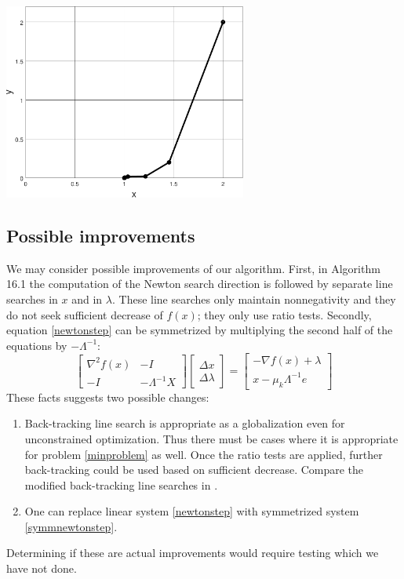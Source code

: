 \documentclass[11pt]{article}
\newcommand{\grad}{\nabla}
\begin{document}
\bigskip
\begin{center}
\includegraphics[width=0.6\textwidth]{testpopdip}
\end{center}


\subsection*{Possible improvements}

We may consider possible improvements of our algorithm.  First, in Algorithm 16.1 the computation of the Newton search direction is followed by separate line searches in $x$ and in $\lambda$.  These line searches only maintain nonnegativity and they do not seek sufficient decrease of $f(x)$; they only use ratio tests.  Secondly, equation \eqref{newtonstep} can be symmetrized by multiplying the second half of the equations by $-\Lambda^{-1}$:
\begin{equation}
\begin{bmatrix}
\grad^2 f(x) & - I \\
-I & - \Lambda^{-1} X
\end{bmatrix}
\begin{bmatrix}
\Delta x \\
\Delta \lambda
\end{bmatrix}
=
\begin{bmatrix}
-\grad f(x) + \lambda \\
x - \mu_k \Lambda^{-1} e
\end{bmatrix}
 \label{symmnewtonstep}
\end{equation}
These facts suggests two possible changes:
\begin{enumerate}
\item Back-tracking line search is appropriate as a globalization even for unconstrained optimization.  Thus there must be cases where it is appropriate for problem \eqref{minproblem} as well.  Once the ratio tests are applied, further back-tracking could be used based on sufficient decrease.  Compare the modified back-tracking line searches in \cite{BensonMunson2006}.
\item One can replace linear system \eqref{newtonstep} with symmetrized system \eqref{symmnewtonstep}.
\end{enumerate}
Determining if these are actual improvements would require testing which we have not done.



\medskip



\end{document}
